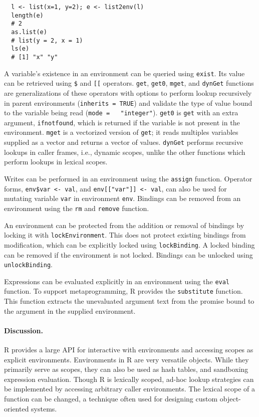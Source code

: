 \documentclass[10pt,review,sigplan,anonymous=true,authorversion=true,nonacm=true]{acmart}
\newcommand{\code}[1]{\lstinline |#1|\xspace}
\newcommand{\subDollar}{\code{$}}
\newcommand{\subBracket}{\code{[[}}
\newcommand{\exist}{\code{exist}}
\newcommand{\get}{\code{get}}
\newcommand{\getZero}{\code{get0}}
\newcommand{\mget}{\code{mget}}
\newcommand{\dynGet}{\code{dynGet}}
\newcommand{\assign}{\code{assign}}
\newcommand{\remove}{\code{remove}}
\renewcommand{\rm}{\code{rm}}
\newcommand{\lockEnvironment}{\code{lockEnvironment}}
\newcommand{\lockBinding}{\code{lockBinding}}
\newcommand{\unlockBinding}{\code{unlockBinding}}
\newcommand{\eval}{\code{eval}}
\newcommand{\substitute}{\code{substitute}}
\begin{document}
\begin{lstlisting}
  l <- list(x=1, y=2); e <- list2env(l)
  length(e)
  # 2
  as.list(e)
  # list(y = 2, x = 1)
  ls(e)
  # [1] "x" "y"
\end{lstlisting}

\noindent
A variable's existence in an environment can be queried using \exist. Its value
can be retrieved using \subDollar and \subBracket operators. \get, \getZero,
\mget, and \dynGet functions are generalizations of these operators with options
to perform lookup recursively in parent environments (\code{inherits = TRUE})
and validate the type of value bound to the variable being read (\code{mode =
  "integer"}). \getZero is \get with an extra argument, \code{ifnotfound}, which
is returned if the variable is not present in the environment. \mget is a
vectorized version of \get; it reads multiples variables supplied as a vector
and returns a vector of values. \dynGet performs recursive lookups in caller
frames, i.e., dynamic scopes, unlike the other functions which perform lookups in
lexical scopes.

Writes can be performed in an environment using the \assign function. Operator
forms, \code{env$var <- val}, and \code{env[["var"]] <- val}, can also be used
for mutating variable \code{var} in environment \code{env}. Bindings
can be removed from an environment using the \rm and \remove function.

An environment can be protected from the addition or removal of bindings by
locking it with \lockEnvironment. This does not protect existing bindings from
modification, which can be explicitly locked using \lockBinding. A locked
binding can be removed if the environment is not locked. Bindings can be
unlocked using \unlockBinding.

Expressions can be evaluated explicitly in an environment using the \eval
function. To support metaprogramming, R provides the \substitute function. This
function extracts the unevaluated argument text from the promise bound to the
argument in the supplied environment.

\paragraph{Discussion.}
R provides a large API for interactive with environments and accessing scopes as
explicit environments. Environments in R are very versatile objects. While they
primarily serve as scopes, they can also be used as hash tables, and sandboxing
expression evaluation. Though R is lexically scoped, ad-hoc lookup strategies
can be implemented by accessing arbitrary caller environments. The lexical scope
of a function can be changed, a technique often used for designing custom
object-oriented systems.
\end{document}
